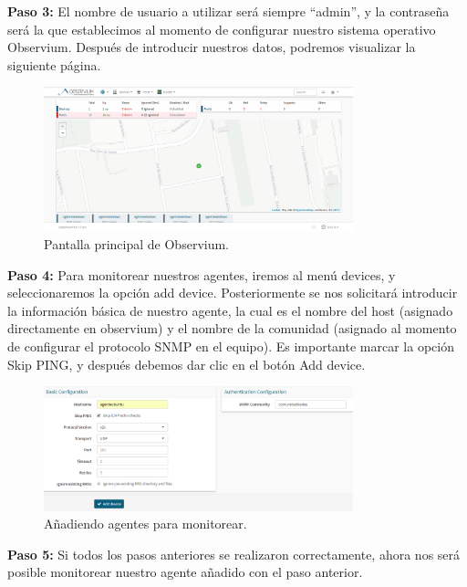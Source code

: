 \noindent
\newline
\textbf{Paso 3:}  El nombre de usuario a utilizar será siempre “admin”, y la contraseña será la que establecimos al momento de configurar nuestro sistema operativo Observium. Después de introducir nuestros datos, podremos visualizar la siguiente página.

\begin{figure}[htbp!]
	\centering
		\includegraphics[width=0.8\textwidth]{images/desarrollo/agregar_agente3.png}
	\caption{Pantalla principal de Observium.}
\end{figure}

\noindent
\newline
\textbf{Paso 4:} Para monitorear nuestros agentes, iremos al menú devices, y seleccionaremos la opción add device. Posteriormente se nos solicitará introducir la información básica de nuestro agente, la cual es el nombre del host (asignado directamente en observium) y el nombre de la comunidad (asignado al momento de configurar el protocolo SNMP en el equipo). Es importante marcar la opción Skip PING, y después debemos dar clic en el botón Add device.

\begin{figure}[htbp!]
	\centering
		\includegraphics[width=0.8\textwidth]{images/desarrollo/agregar_agente4.png}
	\caption{Añadiendo agentes para monitorear.}
\end{figure}

\noindent
\newline
\textbf{Paso 5:} Si todos los pasos anteriores se realizaron correctamente, ahora nos será posible monitorear nuestro agente añadido con el paso anterior.

